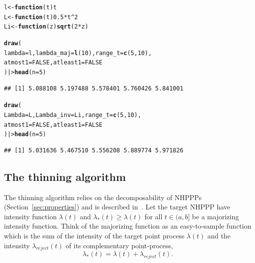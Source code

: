 \documentclass[article]{jss}\usepackage[]{graphicx}\usepackage[]{xcolor}
\makeatletter
\newcommand{\hlnum}[1]{\textcolor[rgb]{0.686,0.059,0.569}{#1}}%
\newcommand{\hlopt}[1]{\textcolor[rgb]{0,0,0}{#1}}%
\newcommand{\hlstd}[1]{\textcolor[rgb]{0.345,0.345,0.345}{#1}}%
\newcommand{\hlkwa}[1]{\textcolor[rgb]{0.161,0.373,0.58}{\textbf{#1}}}%
\newcommand{\hlkwb}[1]{\textcolor[rgb]{0.69,0.353,0.396}{#1}}%
\newcommand{\hlkwc}[1]{\textcolor[rgb]{0.333,0.667,0.333}{#1}}%
\newcommand{\hlkwd}[1]{\textcolor[rgb]{0.737,0.353,0.396}{\textbf{#1}}}%
\newenvironment{kframe}{%
 \def\at@end@of@kframe{}%
 \ifinner\ifhmode%
  \def\at@end@of@kframe{\end{minipage}}%
  \begin{minipage}{\columnwidth}%
 \fi\fi%
 \def\FrameCommand##1{\hskip\@totalleftmargin \hskip-\fboxsep
 \colorbox{shadecolor}{##1}\hskip-\fboxsep
     \hskip-\linewidth \hskip-\@totalleftmargin \hskip\columnwidth}%
 \MakeFramed {\advance\hsize-\width
   \@totalleftmargin\z@ \linewidth\hsize
   \@setminipage}}%
 {\par\unskip\endMakeFramed%
 \at@end@of@kframe}
\newenvironment{knitrout}{}{} %
\makeatother
\begin{document}
\begin{knitrout}
\color{fgcolor}\begin{kframe}
\begin{alltt}
\hlstd{l} \hlkwb{<-} \hlkwa{function}\hlstd{(}\hlkwc{t}\hlstd{) t}
\hlstd{L} \hlkwb{<-} \hlkwa{function}\hlstd{(}\hlkwc{t}\hlstd{)} \hlnum{0.5} \hlopt{*} \hlstd{t}\hlopt{^}\hlnum{2}
\hlstd{Li} \hlkwb{<-} \hlkwa{function}\hlstd{(}\hlkwc{z}\hlstd{)} \hlkwd{sqrt}\hlstd{(}\hlnum{2} \hlopt{*} \hlstd{z)}

\hlkwd{draw}\hlstd{(}
  \hlkwc{lambda} \hlstd{= l,} \hlkwc{lambda_maj} \hlstd{=} \hlkwd{l}\hlstd{(}\hlnum{10}\hlstd{),} \hlkwc{range_t} \hlstd{=} \hlkwd{c}\hlstd{(}\hlnum{5}\hlstd{,} \hlnum{10}\hlstd{),}
  \hlkwc{atmost1} \hlstd{=} \hlnum{FALSE}\hlstd{,} \hlkwc{atleast1} \hlstd{=} \hlnum{FALSE}
\hlstd{) |>} \hlkwd{head}\hlstd{(}\hlkwc{n} \hlstd{=} \hlnum{5}\hlstd{)}
\end{alltt}
\begin{verbatim}
## [1] 5.088108 5.197488 5.578401 5.760426 5.841001
\end{verbatim}
\begin{alltt}
\hlkwd{draw}\hlstd{(}
  \hlkwc{Lambda} \hlstd{= L,} \hlkwc{Lambda_inv} \hlstd{= Li,} \hlkwc{range_t} \hlstd{=} \hlkwd{c}\hlstd{(}\hlnum{5}\hlstd{,} \hlnum{10}\hlstd{),}
  \hlkwc{atmost1} \hlstd{=} \hlnum{FALSE}\hlstd{,} \hlkwc{atleast1} \hlstd{=} \hlnum{FALSE}
\hlstd{) |>} \hlkwd{head}\hlstd{(}\hlkwc{n} \hlstd{=} \hlnum{5}\hlstd{)}
\end{alltt}
\begin{verbatim}
## [1] 5.031636 5.467510 5.556208 5.889774 5.971826
\end{verbatim}
\end{kframe}
\end{knitrout}

\subsection{The thinning algorithm}\label{sec:thinning}
The thinning algorithm relies on the decomposability of NHPPPs (Section~\ref{sec:properties}) and is described in~\citet{lewis1979thinning}. Let the target NHPPP have intensity function $\lambda(t)$ and $\lambda_*(t) \ge \lambda(t)$ for all $t \in (a, b]$ be a majorizing intensity function. Think of the majorizing function as an easy-to-sample function which is the sum of the intensity of the target point process $\lambda(t)$ and the intensity $\lambda_{reject}(t)$ of its complementary point-process,
$$\lambda_*(t) = \lambda(t) + \lambda_{reject}(t).$$
\end{document}
